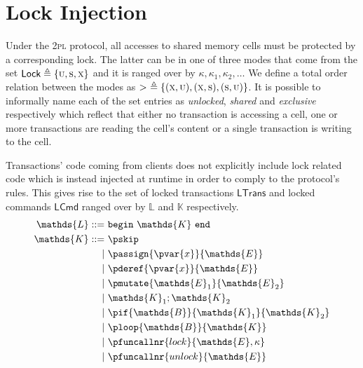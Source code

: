 \section{Lock Injection}

Under the \textsc{2pl} protocol, all accesses to shared memory cells must be protected by a corresponding lock. The latter can be in one of three modes that come from the set $\mathsf{Lock} \triangleq \{ \textsc{u}, \textsc{s}, \textsc{x} \}$ and it is ranged over by $\kappa, \kappa_1, \kappa_2, \ldots$ We define a total order relation between the modes as $>\ \triangleq \{ (\textsc{x}, \textsc{u}), (\textsc{x}, \textsc{s}), (\textsc{s}, \textsc{u}) \}$. It is possible to informally name each of the set entries as \textit{unlocked}, \textit{shared} and \textit{exclusive} respectively which reflect that either no transaction is accessing a cell, one or more transactions are reading the cell's content or a single transaction is writing to the cell.

Transactions' code coming from clients does not explicitly include lock related code which is instead injected at runtime in order to comply to the protocol's rules. This gives rise to the set of locked transactions $\textsf{LTrans}$ and locked commands $\textsf{LCmd}$ ranged over by $\mathds{L}$ and $\mathds{K}$ respectively.
\begin{align*}
\mathds{L} ::=&
\ \mathtt{begin}\ \mathds{K}\ \mathtt{end} \\
\mathds{K} ::=&
\ \pskip \\
|&\ \passign{\pvar{x}}{\mathds{E}} \\
|&\ \pderef{\pvar{x}}{\mathds{E}} \\
|&\ \pmutate{\mathds{E}_1}{\mathds{E}_2} \\
|&\ \mathds{K}_1; \mathds{K}_2 \\
|&\ \pif{\mathds{B}}{\mathds{K}_1}{\mathds{K}_2} \\
|&\ \ploop{\mathds{B}}{\mathds{K}} \\
|&\ \pfuncallnr{lock}{\mathds{E}, \kappa} \\
|&\ \pfuncallnr{unlock}{\mathds{E}}
\end{align*}

